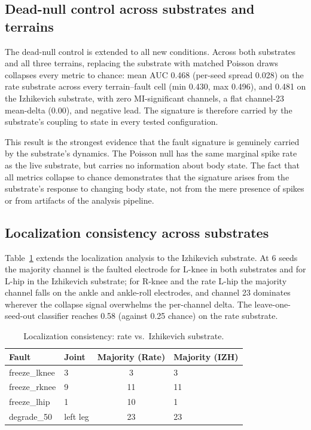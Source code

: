 \subsection{Dead-null control across substrates and terrains}

The dead-null control is extended to all new conditions. Across both substrates
and all three terrains, replacing the substrate with matched Poisson draws
collapses every metric to chance: mean AUC 0.468 (per-seed spread 0.028) on the
rate substrate across every terrain--fault cell (min 0.430, max 0.496), and
0.481 on the Izhikevich substrate, with zero MI-significant channels, a flat
channel-23 mean-delta (0.00), and negative lead.
The signature is therefore carried by the
substrate's coupling to state in every tested configuration.

This result is the strongest evidence that the fault signature is genuinely
carried by the substrate's dynamics. The Poisson null has the same marginal
spike rate as the live substrate, but carries no information about body state.
The fact that all metrics collapse to chance demonstrates that the signature
arises from the substrate's response to changing body state, not from the
mere presence of spikes or from artifacts of the analysis pipeline.

\subsection{Localization consistency across substrates}

Table~\ref{tab:localization_ext} extends the localization analysis to the
Izhikevich substrate. At 6 seeds the majority channel is the faulted electrode
for L-knee in both substrates and for L-hip in the Izhikevich substrate; for
R-knee and the rate L-hip the majority channel falls on the ankle and
ankle-roll electrodes, and channel 23 dominates wherever the collapse signal
overwhelms the per-channel delta. The leave-one-seed-out classifier reaches
0.58 (against 0.25 chance) on the rate substrate.

\begin{table}[t]
\caption{Localization consistency: rate vs.\ Izhikevich substrate.}
\label{tab:localization_ext}
\centering
\small
\renewcommand{\arraystretch}{1.15}
\begin{tabular}{@{}llcl@{}}
\toprule
Fault & Joint & Majority (Rate) & Majority (IZH) \\
\midrule
freeze\_lknee & 3 & 3 & 3 \\
freeze\_rknee & 9 & 11 & 11 \\
freeze\_lhip & 1 & 10 & 1 \\
degrade\_50 & left leg & 23 & 23 \\
\bottomrule
\end{tabular}
\end{table}

